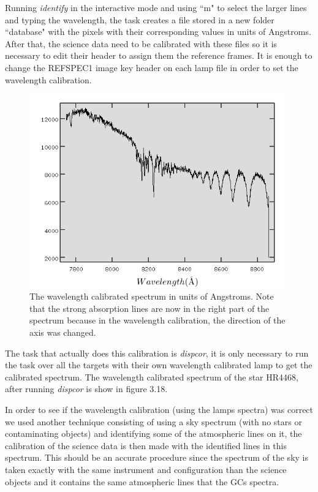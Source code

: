 Running \textit{identify} in the interactive mode and using ``m" to select the larger lines and typing the wavelength, the task creates a file stored in a new folder ``database" with the pixels with their corresponding values in units of Angstroms. After that, the science data need to be calibrated with these files so it is necessary to edit their header to assign them the reference frames. It is enough to change the REFSPEC1 image key header on each lamp file in order to set the wavelength calibration. 

\begin{figure}[H]
\centering
\includegraphics[width=11cm]{images/calib_star_wave.png}
\caption[Wavelength calibrated spectrum of HR4468]{The wavelength calibrated spectrum in units of Angstroms. Note that the strong absorption lines are now in the right part of the spectrum because in the wavelength calibration, the direction of the axis was changed.}
\end{figure}

The task that actually does this calibration is \textit{dispcor}, it is only necessary to run the task over all the targets with their own wavelength calibrated lamp to get the calibrated spectrum. The wavelength calibrated spectrum of the star HR4468, after running \textit{dispcor} is show in figure 3.18.

In order to see if the wavelength calibration (using the lamps spectra) was correct we used another technique consisting of using a sky spectrum (with no stars or contaminating objects) and identifying some of the atmospheric lines on it, the calibration of the science data is then made with the identified lines in this spectrum. This should be an accurate procedure since the spectrum of the sky is taken exactly with the same instrument and configuration than the science objects and it contains the same atmospheric lines that the GCs spectra. 

